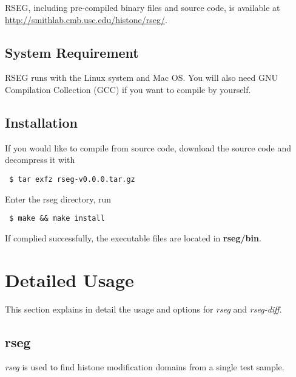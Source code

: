 \documentclass[11pt]{report}
\begin{document}
RSEG, including pre-compiled binary files and source code, is
available at \url{http://smithlab.cmb.usc.edu/histone/rseg/}.

\subsection*{System Requirement}

RSEG runs with the Linux system and Mac OS. You will also need GNU
Compilation Collection (GCC) if you want to compile by yourself.

\subsection*{Installation}

If you would like to compile from source code, download the source
code and decompress it with
\begin{verbatim}
 $ tar exfz rseg-v0.0.0.tar.gz
\end{verbatim}
%
Enter the rseg directory, run
\begin{verbatim}
 $ make && make install
\end{verbatim}
If complied successfully, the executable files are located in \textbf{rseg/bin}.

\section{Detailed Usage}
\label{sec:usage-detail}

This section explains in detail the usage and options for
\textit{rseg} and \textit{rseg-diff}.

\subsection{rseg}
\label{sec:rseg-detail}

\textit{rseg} is used to find histone modification domains from a
single test sample. 
\end{document}
